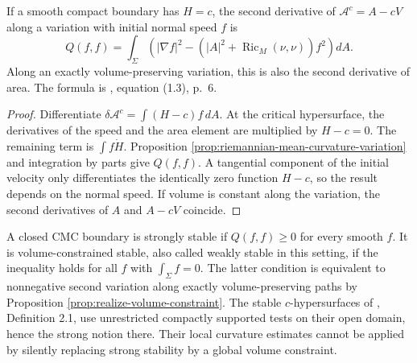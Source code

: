 \begin{proposition}\label{prop:cmc-second-variation}
If a smooth compact boundary has $H=c$, the second derivative of $\mathcal A^c=A-cV$ along a variation with initial normal speed $f$ is
\[
 Q(f,f)=\int_\Sigma\left(|\nabla f|^2-
 (|A|^2+\operatorname{Ric}_M(\nu,\nu))f^2\right)dA.
\]
Along an exactly volume-preserving variation, this is also the second derivative of area. The formula is \cite{ZZCMC}, equation (1.3), p.~6.
\end{proposition}
\begin{proof}
Differentiate $\delta\mathcal A^c=\int(H-c)f\,dA$. At the critical hypersurface, the derivatives of the speed and the area element are multiplied by $H-c=0$. The remaining term is $\int f\dot H$. Proposition \ref{prop:riemannian-mean-curvature-variation} and integration by parts give $Q(f,f)$. A tangential component of the initial velocity only differentiates the identically zero function $H-c$, so the result depends on the normal speed. If volume is constant along the variation, the second derivatives of $A$ and $A-cV$ coincide.
\end{proof}

\begin{definition}\label{def:cmc-stability-types}
A closed CMC boundary is strongly stable if $Q(f,f)\geq0$ for every smooth $f$. It is volume-constrained stable, also called weakly stable in this setting, if the inequality holds for all $f$ with $\int_\Sigma f=0$. The latter condition is equivalent to nonnegative second variation along exactly volume-preserving paths by Proposition \ref{prop:realize-volume-constraint}. The stable $c$-hypersurfaces of \cite{ZZCMC}, Definition 2.1, use unrestricted compactly supported tests on their open domain, hence the strong notion there. Their local curvature estimates cannot be applied by silently replacing strong stability by a global volume constraint.
\end{definition}

